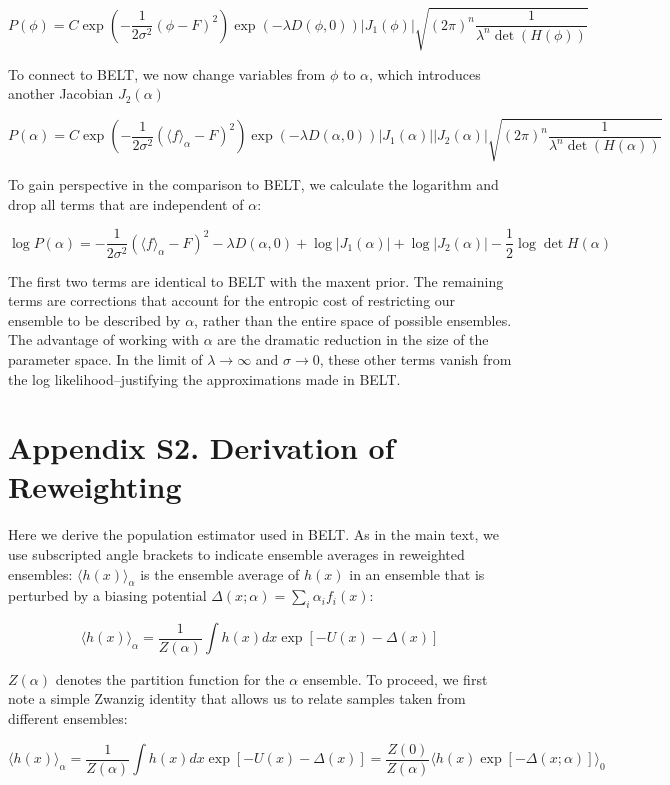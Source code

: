 \documentclass[12pt]{article}
\begin{document}
$$P(\phi) = C \exp(-\frac{1}{2\sigma^2} (\phi - F)^2) \exp(-\lambda  D(\phi, 0)) |J_1(\phi)|  \sqrt{(2\pi)^n \frac{1}{\lambda^n \det (H(\phi))}}  $$

To connect to BELT, we now change variables from $\phi$ to $\alpha$, which introduces another Jacobian $J_2(\alpha)$

$$P(\alpha) = C \exp(-\frac{1}{2\sigma^2} (\langle f \rangle_\alpha - F)^2) \exp(-\lambda  D(\alpha, 0)) |J_1(\alpha)|  |J_2(\alpha)|  \sqrt{(2\pi)^n \frac{1}{\lambda^n \det (H(\alpha))}}$$

To gain perspective in the comparison to BELT, we calculate the logarithm and drop all terms that are independent of $\alpha$:

$$\log P(\alpha) = -\frac{1}{2\sigma^2} (\langle f \rangle_\alpha - F)^2 -\lambda  D(\alpha, 0) + \log |J_1(\alpha)| + \log |J_2(\alpha)| - \frac{1}{2} \log \det H(\alpha)$$

The first two terms are identical to BELT with the maxent prior.  The remaining terms are corrections that account for the entropic cost of restricting our ensemble to be described by $\alpha$, rather than the entire space of possible ensembles.  The advantage of working with $\alpha$ are the dramatic reduction in the size of the parameter space.  In the limit of $\lambda \rightarrow \infty$ and $\sigma \rightarrow 0$, these other terms vanish from the log likelihood--justifying the approximations made in BELT.  

\section*{Appendix S2.  Derivation of Reweighting}

Here we derive the population estimator used in BELT.  As in the main text, we use subscripted angle brackets to indicate ensemble averages in reweighted ensembles: $\langle h(x)\rangle _\alpha$ is the ensemble average of $h(x)$ in an ensemble that is perturbed by a biasing potential $\Delta (x;\alpha) = \sum_i \alpha_i f_i(x)$:

$$\langle h(x)\rangle _\alpha = \frac{1}{Z(\alpha)} \int h(x) dx \exp[ -U(x) - \Delta(x)]$$

$Z(\alpha)$ denotes the partition function for the $\alpha$ ensemble.  To proceed, we first note a simple Zwanzig identity that allows us to relate samples taken from different ensembles:

$$\langle h(x)\rangle _\alpha = \frac{1}{Z(\alpha)} \int h(x) dx \exp[ -U(x) - \Delta(x)] = \frac{Z(0)}{Z(\alpha)} \langle h(x) \exp[-\Delta(x;\alpha)]\rangle _0 $$
\end{document}
